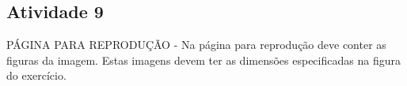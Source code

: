 \documentclass{book}
\begin{document}
\begin{multicols}{2}
\subsection{Atividade 9}
  

  \begin{imagem*}[breakable]{}{}
    \begin{nota*}[breakable]{}{}       PÁGINA PARA REPRODUÇÃO - Na página para reprodução deve conter as figuras da imagem. Estas imagens devem ter as dimensões especificadas na figura do exercício.
    \end{nota*}
  \end{imagem*}



\end{multicols}
\end{document}
